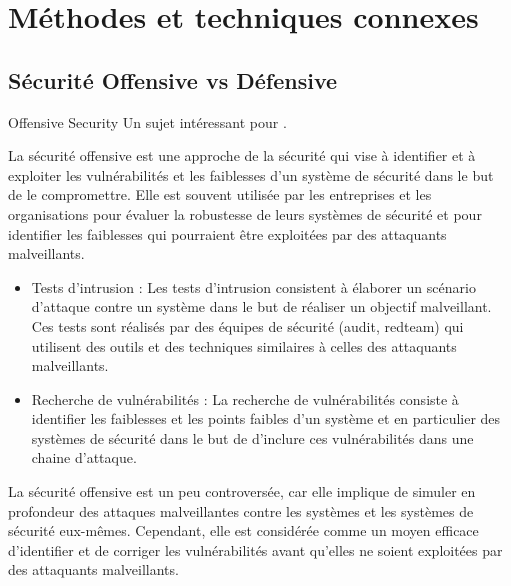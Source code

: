 %
%



\section{Méthodes et techniques connexes}

\subsection{Sécurité Offensive vs Défensive}

\begin{techworkbox}{Offensive Security}
Un sujet intéressant pour \fichetech. 
\end{techworkbox}

La sécurité offensive est une approche de la sécurité qui vise à identifier et à exploiter les vulnérabilités et les faiblesses d'un système de sécurité dans le but de le compromettre. Elle est souvent utilisée par les entreprises et les organisations pour évaluer la robustesse de leurs systèmes de sécurité et pour identifier les faiblesses qui pourraient être exploitées par des attaquants malveillants.

\begin{itemize}
  \item Tests d'intrusion : Les tests d'intrusion consistent à élaborer un scénario d'attaque contre un système  dans le but de réaliser un objectif malveillant. Ces tests sont  réalisés par des équipes de sécurité (audit, redteam) qui utilisent des outils et des techniques similaires à celles des attaquants malveillants.
  \item Recherche de vulnérabilités : La recherche de vulnérabilités consiste à identifier les faiblesses et les points faibles d'un système et en particulier des systèmes de sécurité dans le but de d'inclure ces vulnérabilités dans une chaine d'attaque.
\end{itemize}

La sécurité offensive est un peu controversée, car elle implique de simuler en profondeur des attaques malveillantes contre les systèmes et les systèmes de sécurité eux-mêmes. Cependant, elle est considérée comme un moyen efficace d'identifier et de corriger les vulnérabilités avant qu'elles ne soient exploitées par des attaquants malveillants.

